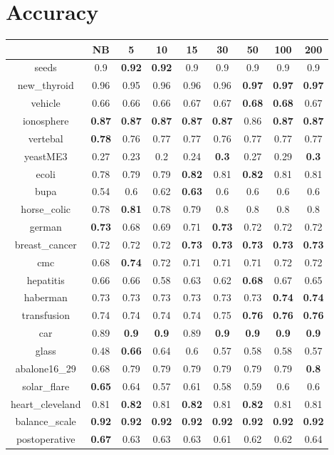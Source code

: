 \documentclass{article}%
\begin{document}
%
\normalsize%
\section*{Accuracy}%
\begin{tabular}{c|cccccccc}%
\hline%
&NB&5&10&15&30&50&100&200\\%
\hline%
seeds&0.9&\textbf{0.92}&\textbf{0.92}&0.9&0.9&0.9&0.9&0.9\\%
new\_thyroid&0.96&0.95&0.96&0.96&0.96&\textbf{0.97}&\textbf{0.97}&\textbf{0.97}\\%
vehicle&0.66&0.66&0.66&0.67&0.67&\textbf{0.68}&\textbf{0.68}&0.67\\%
ionosphere&\textbf{0.87}&\textbf{0.87}&\textbf{0.87}&\textbf{0.87}&\textbf{0.87}&0.86&\textbf{0.87}&\textbf{0.87}\\%
vertebal&\textbf{0.78}&0.76&0.77&0.77&0.76&0.77&0.77&0.77\\%
yeastME3&0.27&0.23&0.2&0.24&\textbf{0.3}&0.27&0.29&\textbf{0.3}\\%
ecoli&0.78&0.79&0.79&\textbf{0.82}&0.81&\textbf{0.82}&0.81&0.81\\%
bupa&0.54&0.6&0.62&\textbf{0.63}&0.6&0.6&0.6&0.6\\%
horse\_colic&0.78&\textbf{0.81}&0.78&0.79&0.8&0.8&0.8&0.8\\%
german&\textbf{0.73}&0.68&0.69&0.71&\textbf{0.73}&0.72&0.72&0.72\\%
breast\_cancer&0.72&0.72&0.72&\textbf{0.73}&\textbf{0.73}&\textbf{0.73}&\textbf{0.73}&\textbf{0.73}\\%
cmc&0.68&\textbf{0.74}&0.72&0.71&0.71&0.71&0.72&0.72\\%
hepatitis&0.66&0.66&0.58&0.63&0.62&\textbf{0.68}&0.67&0.65\\%
haberman&0.73&0.73&0.73&0.73&0.73&0.73&\textbf{0.74}&\textbf{0.74}\\%
transfusion&0.74&0.74&0.74&0.74&0.75&\textbf{0.76}&\textbf{0.76}&\textbf{0.76}\\%
car&0.89&\textbf{0.9}&\textbf{0.9}&0.89&\textbf{0.9}&\textbf{0.9}&\textbf{0.9}&\textbf{0.9}\\%
glass&0.48&\textbf{0.66}&0.64&0.6&0.57&0.58&0.58&0.57\\%
abalone16\_29&0.68&0.79&0.79&0.79&0.79&0.79&0.79&\textbf{0.8}\\%
solar\_flare&\textbf{0.65}&0.64&0.57&0.61&0.58&0.59&0.6&0.6\\%
heart\_cleveland&0.81&\textbf{0.82}&0.81&\textbf{0.82}&0.81&\textbf{0.82}&0.81&0.81\\%
balance\_scale&\textbf{0.92}&\textbf{0.92}&\textbf{0.92}&\textbf{0.92}&\textbf{0.92}&\textbf{0.92}&\textbf{0.92}&\textbf{0.92}\\%
postoperative&\textbf{0.67}&0.63&0.63&0.63&0.61&0.62&0.62&0.64\\%
\end{tabular}
\end{document}
